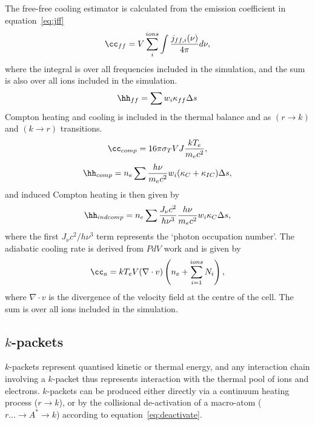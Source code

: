 The free-free cooling estimator is calculated from the emission coefficient
in equation~\ref{eq:jff} 
\begin{equation}
\cc_{ff} = V \sum_i^{ions} \int \frac{j_{ff,i}(\nu)}{4\pi} d\nu,
\end{equation}
where the integral is over all frequencies included in the simulation,
and the sum is also over all ions included in the simulation.
\begin{equation}
\hh_{ff} = \sum w_i \kappa_{ff} \Delta s
\end{equation}
Compton heating and cooling is included in the thermal balance and as
$(r\rightarrow k)$ and $(k\rightarrow r)$ transitions.
\begin{equation}
\cc_{comp} = 16 \pi \sigma_T V J \frac{k T_e}{m_e c^2},
\end{equation}
\begin{equation}
\hh_{comp} = n_e \sum \frac{h\nu}{m_e c^2} w_i (\kappa_{C} + \kappa_{IC}) \Delta s,
\end{equation}
and induced Compton heating is then given by \citep{cloudy2013}
\begin{equation}
\hh_{ind comp} = n_e \sum \frac{J_\nu c^2}{h \nu^3} \frac{h\nu}{m_e c^2} 
w_i \kappa_{C} \Delta s,
\end{equation}
where the first $J_\nu c^2/h \nu^3$ term represents the `photon occupation number'.
The adiabatic cooling rate is derived from $PdV$ work and is given by
\begin{equation}
\cc_{a} = k T_e V (\nabla \cdot v) \left(n_e + \sum\limits_{i=1}^{ions} N_i\right),
\end{equation}
where $\nabla \cdot v$ is the divergence of the 
velocity field at the centre of the cell. The sum is over all ions 
included in the simulation.

\noindent

\subsection{$k$-packets}
$k$-packets represent quantised kinetic or thermal energy, and any interaction
chain involving a $k$-packet thus represents interaction with the thermal
pool of ions and electrons. $k$-packets can be produced either directly
via a continuum heating process ($r \rightarrow k$), 
or by the collisional de-activation of a macro-atom 
($r \ldots \rightarrow A^* \rightarrow k$) according to equation~\ref{eq:deactivate}. 

